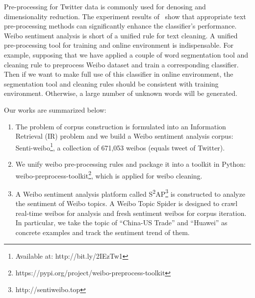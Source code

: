 \documentclass[runningheads]{llncs}
\begin{document}
Pre-processing for Twitter data is commonly used for denosing and dimensionality reduction. The experiment results of~\cite{haddi2013role} show that appropriate text pre-processing methods can significantly enhance the classifier's performance. Weibo sentiment analysis is short of a unified rule for text cleaning. A unified pre-processing tool for training and online environment is indispensable. For example, supposing that we have applied a couple of word segmentation tool and cleaning rule to preprocess Weibo dataset and train a corresponding classifier. Then if we want to make full use of this classifier in online environment, the segmentation tool and cleaning rules should be consistent with training environment. Otherwise, a large number of unknown words will be generated.

Our works are summarized below:
\begin{enumerate}
\item The problem of corpus construction is formulated into an Information Retrieval (IR) problem and we build a Weibo sentiment analysis corpus: Senti-weibo\footnote{Available at: http://bit.ly/2IEzTw1}, a collection of 671,053 weibos (equals tweet of Twitter).

\item We unify weibo pre-processing rules and package it into a toolkit in Python: weibo-preprocess-toolkit\footnote{https://pypi.org/project/weibo-preprocess-toolkit}, which is applied for weibo cleaning. 

\item A Weibo sentiment analysis platform called S\textsuperscript{2}AP\footnote{http://sentiweibo.top} is constructed to analyze the sentiment of Weibo topics. A Weibo Topic Spider is designed to crawl real-time weibos for analysis and fresh sentiment weibos for corpus iteration. In particular, we take the topic of ``China-US Trade'' and ``Huawei'' as concrete examples and track the sentiment trend of them.
\end{enumerate}
\end{document}
